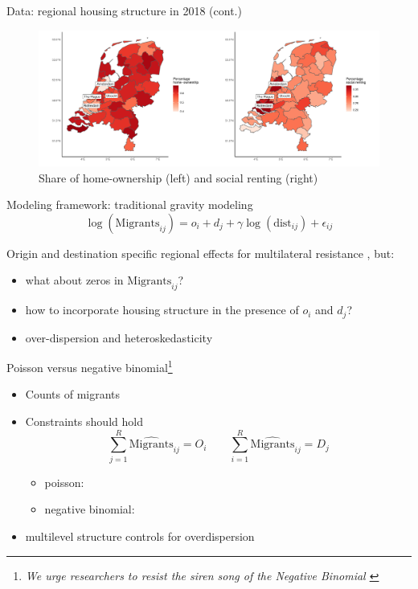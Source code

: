 \documentclass{beamer}
\begin{document}
\begin{frame}{Data: regional housing structure in 2018 (cont.)}
		\begin{figure}
		  \includegraphics[width=1\textwidth]{../../fig/housing_types}
		  \caption{Share of home-ownership (left) and social renting (right)}
		  \end{figure}
\end{frame}


\begin{frame}{Modeling framework: traditional gravity modeling}
	\begin{equation*}
	\log(\text{Migrants}_{ij}) = o_i + d_j + \gamma\log(\text{dist}_{ij}) + \epsilon_{ij}
	\label{eq:gravfixed}
	\end{equation*} 
	
	Origin and destination specific \alert{regional} effects for multilateral resistance  \citep{anderson2003gravity}, but:
	\begin{itemize}
		\item what about \alert{zeros} in $\text{Migrants}_{ij}$?
		\item how to incorporate \alert{housing} structure in the presence of $o_i$ and $d_j$?
		\item \alert{over-dispersion} and \alert{heteroskedasticity} \footnotesize{\citep{silva2006log} }
	\end{itemize}
\end{frame}

\begin{frame}{Poisson versus negative binomial\footnote{
			\emph{We urge researchers to resist the siren song of the Negative
			Binomial \footnotesize{ \citep{head2014gravity}} }
			}}
	
	\begin{itemize}
		\item \alert{Counts} of migrants\newline 
		\item \alert{Constraints} should hold
		$$
		\sum_{j=1}^{R} {\widehat{\text{Migrants} }_{ij} } = O_i \qquad \sum_{i=1}^{R} {\widehat{\text{Migrants} }_{ij} } = D_j
		$$
		\begin{itemize}
			\item poisson: 
		    \item negative binomial:  \newline
		  \end{itemize}
		  \item multilevel structure  \alert{controls} for overdispersion
		\end{itemize}

\end{frame}
\end{document}
